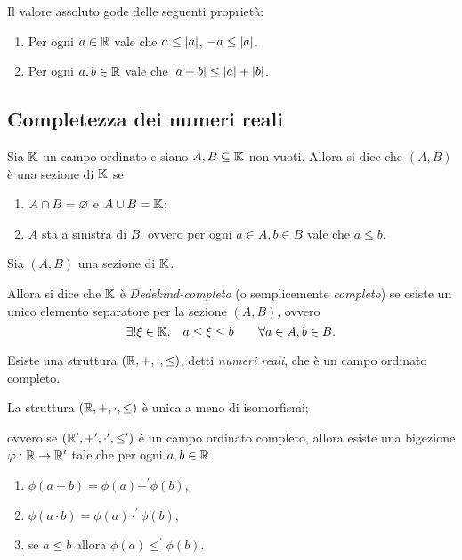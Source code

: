 \begin{proposition}
    Il valore assoluto gode delle seguenti proprietà:
    \begin{enumerate}
        \item Per ogni $a \in \R$ vale che $a \leq \abs*{a}$, $-a \leq \abs*{a}$.
        \item Per ogni $a, b \in \R$ vale che $\abs*{a + b} \leq \abs*{a} + \abs*{b}$.
    \end{enumerate}
\end{proposition}

\subsection{Completezza dei numeri reali}

\begin{definition} [Sezione]
    \label{def:sezione}
    Sia $\K$ un campo ordinato e siano $A, B \subseteq \K$ non vuoti. Allora si dice che $(A, B)$ è una sezione di $\K$ se \begin{enumerate}[label={(\roman*)}, ref={\thedefinition: (\roman*)}]
        \item \label{def:sezione:part} $A \inters B = \varnothing$ e $A \union B = \K$;
        \item \label{def:sezione:sx} $A$ sta a sinistra di $B$, ovvero per ogni $a \in A, b \in B$ vale che $a \leq b$.
    \end{enumerate}
\end{definition}

\begin{unnamed}
    \label{ax:dedekind}
    Sia $(A, B)$ una sezione di $\K$.

    Allora si dice che $\K$ è \emph{Dedekind-completo} (o semplicemente \emph{completo}) se esiste un unico elemento separatore per la sezione $(A, B)$, ovvero \[
        \exists! \xi \in \K. \quad a \leq \xi \leq b \qquad \forall a \in A, b \in B.
    \]
\end{unnamed}

\begin{theorem}
    Esiste una struttura $(\R, +, \cdot, \leq)$, detti \emph{numeri reali}, che è un campo ordinato completo.
\end{theorem}

\begin{theorem}
    La struttura $(\R, +, \cdot, \leq)$ è unica a meno di isomorfismi; 
    
    ovvero se $(\R^\prime, +^\prime, \cdot^\prime, \leq^\prime)$ è un campo ordinato completo, allora esiste una bigezione $\phi : \R \to \R^\prime$ tale che per ogni $a, b \in \R$ \begin{enumerate}[label={(\roman*)}]
        \item $\phi(a + b) = \phi(a) +^\prime \phi(b)$,
        \item $\phi(a \cdot b) = \phi(a) \cdot^\prime \phi(b)$,
        \item se $a \leq b$ allora $\phi(a) \leq^\prime \phi(b)$.
    \end{enumerate}
\end{theorem}

